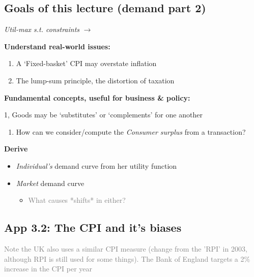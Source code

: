 \documentclass[]{article}
\providecommand{\tightlist}{%
  \setlength{\itemsep}{0pt}\setlength{\parskip}{0pt}}
\begin{document}
\hypertarget{goals-of-this-lecture-demand-part-2}{%
\subsection{Goals of this lecture (demand part 2)}\label{goals-of-this-lecture-demand-part-2}}

\emph{Util-max s.t. constraints} \(\rightarrow\)

\textbf{Understand real-world issues:}

\begin{enumerate}
\def\labelenumi{\arabic{enumi}.}
\item
  A `Fixed-basket' CPI may overstate inflation
\item
  The lump-sum principle, the distortion of taxation
\end{enumerate}

\textbf{Fundamental concepts, useful for business \& policy:}

1, Goods may be `substitutes' or `complements' for one another

\begin{enumerate}
\def\labelenumi{\arabic{enumi}.}
\setcounter{enumi}{1}
\tightlist
\item
  How can we consider/compute the \emph{Consumer surplus} from a transaction?
\end{enumerate}

\textbf{Derive}

\begin{itemize}
\item
  \emph{Individual's} demand curve from her utility function
\item
  \emph{Market} demand curve

  \begin{itemize}
  \tightlist
  \item
    \textcolor{gray}{What causes *shifts* in either?}
  \end{itemize}
\end{itemize}

\bigskip

\hypertarget{app-3.2-the-cpi-and-its-biases}{%
\subsection{App 3.2: The CPI and it's biases}\label{app-3.2-the-cpi-and-its-biases}}

\textcolor{gray}{Note the UK also uses a similar CPI measure (change from the 'RPI' in 2003, although RPI is still used for some things). The Bank of England targets a 2\% increase in the CPI per year}
\end{document}
